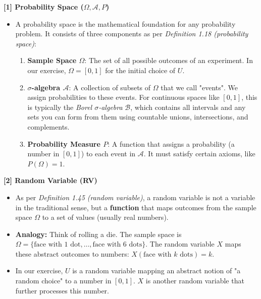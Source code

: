 \documentclass[11pt,a4paper]{article}
\begin{document}
\begin{tcolorbox}[colback=blue!5!white,colframe=blue!75!black,title=In-depth Concepts]

\hypertarget{concept:pspace}{\textbf{[1] Probability Space ($\Omega, \mathcal{A}, P$)}}
\begin{itemize}
    \item A probability space is the mathematical foundation for any probability problem. It consists of three components as per \textit{Definition 1.18 (probability space)}:
    \begin{enumerate}
        \item \textbf{Sample Space $\Omega$}: The set of all possible outcomes of an experiment. In our exercise, $\Omega = [0, 1]$ for the initial choice of $U$.
        \item \textbf{$\sigma$-algebra $\mathcal{A}$}: A collection of subsets of $\Omega$ that we call "events". We assign probabilities to these events. For continuous spaces like $[0, 1]$, this is typically the \textit{Borel $\sigma$-algebra} $\mathcal{B}$, which contains all intervals and any sets you can form from them using countable unions, intersections, and complements.
        \item \textbf{Probability Measure $P$}: A function that assigns a probability (a number in $[0, 1]$) to each event in $\mathcal{A}$. It must satisfy certain axioms, like $P(\Omega)=1$.
    \end{enumerate}
\end{itemize}
\end{tcolorbox}

\begin{tcolorbox}[colback=green!5!white,colframe=green!75!black,title=In-depth Concepts]
\hypertarget{concept:rv}{\textbf{[2] Random Variable (RV)}}
\begin{itemize}
    \item As per \textit{Definition 1.45 (random variable)}, a random variable is not a variable in the traditional sense, but a \textbf{function} that maps outcomes from the sample space $\Omega$ to a set of values (usually real numbers).
    \item \textbf{Analogy:} Think of rolling a die. The sample space is $\Omega = \{\text{face with 1 dot}, \dots, \text{face with 6 dots}\}$. The random variable $X$ maps these abstract outcomes to numbers: $X(\text{face with } k \text{ dots}) = k$.
    \item In our exercise, $U$ is a random variable mapping an abstract notion of "a random choice" to a number in $[0, 1]$. $X$ is another random variable that further processes this number.
\end{itemize}
\end{tcolorbox}
\end{document}
